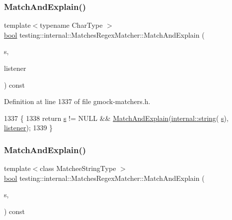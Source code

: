 \subsubsection{\texorpdfstring{Match\+And\+Explain()}{MatchAndExplain()}\hspace{0.1cm}{\footnotesize\ttfamily [1/2]}}
{\footnotesize\ttfamily template$<$typename Char\+Type $>$ \\
\hyperlink{classbool}{bool} testing\+::internal\+::\+Matches\+Regex\+Matcher\+::\+Match\+And\+Explain (\begin{DoxyParamCaption}\item[{Char\+Type $\ast$}]{s,  }\item[{\hyperlink{classtesting_1_1MatchResultListener}{Match\+Result\+Listener} $\ast$}]{listener }\end{DoxyParamCaption}) const\hspace{0.3cm}{\ttfamily [inline]}}



Definition at line 1337 of file gmock-\/matchers.\+h.


\begin{DoxyCode}
1337                                                                          \{
1338     \textcolor{keywordflow}{return} \hyperlink{namespaceservice__node__3_aa976421a49e0b54f23833423400849ae}{s} != NULL && \hyperlink{classtesting_1_1internal_1_1MatchesRegexMatcher_a00f5f9b19a5308d8daacc502c88a91ba}{MatchAndExplain}(\hyperlink{namespacetesting_1_1internal_a8e8ff5b11e64078831112677156cb111}{internal::string}(
      \hyperlink{namespaceservice__node__3_aa976421a49e0b54f23833423400849ae}{s}), \hyperlink{namespaceinteractive__marker_a0e579ab555212bb5e2c9f8a675b7618a}{listener});
1339   \}
\end{DoxyCode}
\mbox{\label{classtesting_1_1internal_1_1MatchesRegexMatcher_a57042ed4ce640738728d976f63f0702e}} 
\subsubsection{\texorpdfstring{Match\+And\+Explain()}{MatchAndExplain()}\hspace{0.1cm}{\footnotesize\ttfamily [2/2]}}
{\footnotesize\ttfamily template$<$class Matchee\+String\+Type $>$ \\
\hyperlink{classbool}{bool} testing\+::internal\+::\+Matches\+Regex\+Matcher\+::\+Match\+And\+Explain (\begin{DoxyParamCaption}\item[{const Matchee\+String\+Type \&}]{s,  }\item[{\hyperlink{classtesting_1_1MatchResultListener}{Match\+Result\+Listener} $\ast$}]{ }\end{DoxyParamCaption}) const\hspace{0.3cm}{\ttfamily [inline]}}



